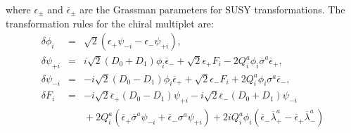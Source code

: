 \documentclass[a4paper,12pt]{article}
\begin{document}
where $\epsilon_\pm$ and $\overline{\epsilon}_\pm$ are 
the Grassman parameters for SUSY transformations. 
The transformation rules for the chiral multiplet are:
\begin{eqnarray}
\delta \phi_i&=& \sqrt{2} (\epsilon_+ \psi_{-i}-\epsilon_- \psi_{+i}),
\nonumber \\
\delta \psi_{+i}&=&i \sqrt{2}(D_0 + D_1) \phi_i
\overline{\epsilon}_-+\sqrt{2}\epsilon_+F_i-2Q_i^a \phi_i
\overline{\sigma}^a\overline{\epsilon}_+, \nonumber \\
\delta \psi_{-i}&=&-i \sqrt{2}(D_0 - D_1) \phi_i \overline{\epsilon}_+
+ \sqrt{2} \epsilon_- F_i+2Q_i^a \phi_i \sigma^a\overline{\epsilon}_-,
 \\
\delta F_i&=&-i \sqrt{2} \overline{\epsilon}_+(D_0 - D_1) \psi_{+i}
-i \sqrt{2}\overline{\epsilon}_-(D_0 + D_1)\psi_{-i} \nonumber \\
& & \mbox{} +2Q_i^a(\overline{\epsilon}_+ \overline{\sigma}^a \psi_{-i}
 + \overline{\epsilon}_- \sigma^a\psi_{+i} )
+2iQ_i^a\phi_i(\overline{\epsilon}_- \overline{\lambda}_+^a- 
\overline{\epsilon}_+ \overline{\lambda}_-^a)
\label{chiraltrans}
\end{eqnarray}
\end{document}
